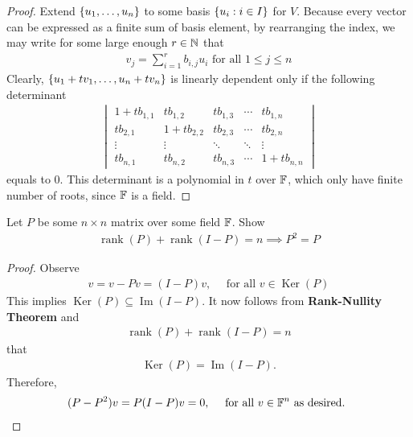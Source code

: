 \documentclass{report}
\begin{document}
\begin{proof}
Extend $\{ u_1,\dots ,u_n \}$ to some basis  $\{ u_i:i \in I \}$ for $V$. Because every vector can be expressed as a finite sum of basis element, by rearranging the index, we may write  for some large enough $r\in\mathbb{N}$ that 
 \begin{align*}
v_j= \sum_{i=1}^r b_{i,j}u_i\text{ for all }1\leq j \leq n
\end{align*}
Clearly, $\{ u_1+t v_1,\dots ,u_n+t v_n \}$ is linearly dependent only if the following determinant  
\begin{align*}
\begin{vmatrix} 
  1+t b_{1,1} & t b_{1,2} & t b_{1,3} & \cdots  & t b_{1,n} \\
  t b_{2,1} & 1+ t b_{2,2} & t b_{2,3} & \cdots &t b_{2,n}  \\
  \vdots & \vdots & \ddots & \ddots &\vdots  \\
  t b_{n,1} & t b_{n,2} & t b_{n,3} & \cdots  & 1+t b_{n,n}
\end{vmatrix} 
\end{align*}
equals to $0$. This determinant is a polynomial in $t$ over $\mathbb{F}$, which only have finite number of roots, since $\mathbb{F}$ is a field. 
\end{proof}
\begin{question}{}{}
Let $P$ be some  $n\times n$ matrix over some field $\mathbb{F}$. Show 
\begin{align*}
\operatorname{rank}(P)+\operatorname{rank}(I-P)= n \implies P^2=P
\end{align*}
\end{question}
\begin{proof}
Observe 
\begin{align*}
v=v- Pv= (I-P)v,\quad\text{ for all }v \in \operatorname{Ker}(P)
\end{align*}
This implies $\operatorname{Ker}(P)\subseteq \operatorname{Im}(I-P)$. It now follows from \textbf{Rank-Nullity Theorem} and  
\begin{align*}
\operatorname{rank}(P) + \operatorname{rank}(I-P)=n 
\end{align*}
that
\begin{align*}
\operatorname{Ker}(P)=\operatorname{Im}(I-P). 
\end{align*}
Therefore, 
\begin{align*}
  (P-P^2)v=P(I-P)v=0,\quad \text{ for all }v \in \mathbb{F}^n\text{ as desired. }
\end{align*}
\end{proof}
\end{document}
